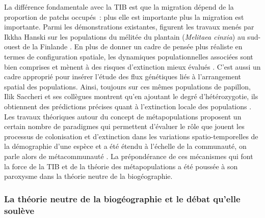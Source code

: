 La différence fondamentale avec la TIB est que la migration dépend de la
proportion de patchs occupés~: plus elle est importante plus la
migration est importante. Parmi les démonstrations existantes, figurent
les travaux menés par Ikkha Hanski sur les populations du mélitée du
plantain (\emph{Melitaea cinxia}) au sud-ouest de la Finlande
\citep{Hanski1998}. En plus de donner un cadre de pensée plus réaliste
en termes de configuration spatiale, les dynamiques populationnelles
associées sont bien comprises et mènent à des risques d'extinction mieux
évalués \citep{Hanski1998}. C'est aussi un cadre approprié pour insérer
l'étude des flux génétiques liés à l'arrangement spatial des
populations. Ainsi, toujours sur ces mêmes populations de papillon, Ilik
Saccheri et ses collègues montrent qu'en ajoutant le degré
d'hétérozygotie, ils obtiennent des prédictions précises quant à
l'extinction locale des populations \citep{Saccheri1998}. Les travaux
théoriques autour du concept de métapopulations proposent un certain
nombre de paradigmes qui permettent d'évaluer le rôle que jouent les
processus de colonisation et d'extinction dans les variations
spatio-temporelles de la démographie d'une espèce et a été étendu à
l'échelle de la communauté, on parle alors de métacommunauté
\citep{Leibold2004, Holyoak2005}. La prépondérance de ces mécanismes qui
font la force de la TIB et de la théorie des métapopulations a été
poussée à son paroxysme dans la théorie neutre de la biogéographie.

\subsubsection*{La théorie neutre de la biogéographie et le débat
qu'elle
soulève}\label{la-thuxe9orie-neutre-de-la-bioguxe9ographie-et-le-duxe9bat-quelle-souluxe8ve}

